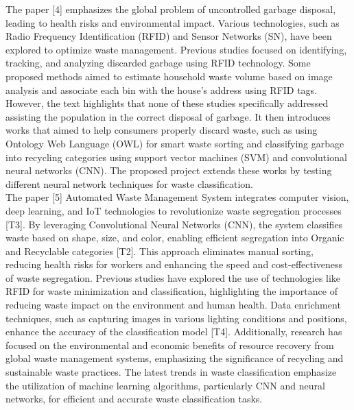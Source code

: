 \documentclass[12pt, English]{article}
\begin{document}
The paper [4]  emphasizes the global problem of uncontrolled garbage disposal, leading to health risks and environmental impact. Various technologies, such as Radio Frequency Identification (RFID) and Sensor Networks (SN), have been explored to optimize waste management. Previous studies focused on identifying, tracking, and analyzing discarded garbage using RFID technology. Some
proposed methods aimed to estimate household waste volume based on image analysis and associate each bin with the house’s address using RFID tags. However, the text highlights that none of these studies specifically addressed assisting the population in the correct disposal of garbage. It then introduces works that aimed to help consumers properly discard waste, such as using Ontology Web
Language (OWL) for smart waste sorting and classifying garbage into recycling categories using support vector machines (SVM) and convolutional neural networks (CNN). The proposed project extends these works by testing different neural network techniques for waste classification.\\
The paper [5] Automated Waste Management System integrates computer vision, deep learning, and IoT technologies to revolutionize waste segregation processes [T3]. By leveraging Convolutional Neural Networks (CNN), the system classifies waste based on shape, size, and color, enabling efficient segregation into Organic and Recyclable categories [T2]. This approach eliminates manual sorting, reducing health risks for workers and enhancing the speed and cost-effectiveness of waste segregation. Previous studies have explored the use of technologies like RFID for waste minimization and classification, highlighting the importance of reducing waste impact on the environment and human health. Data enrichment techniques, such as capturing images in various lighting conditions and positions, enhance the accuracy of the classification model [T4]. Additionally, research has focused on the environmental and economic benefits of resource recovery from global waste management systems, emphasizing the significance of recycling and sustainable waste practices. The latest trends in waste classification emphasize the utilization of machine learning algorithms, particularly CNN and neural networks, for efficient and accurate waste classification tasks.\\
\end{document}
